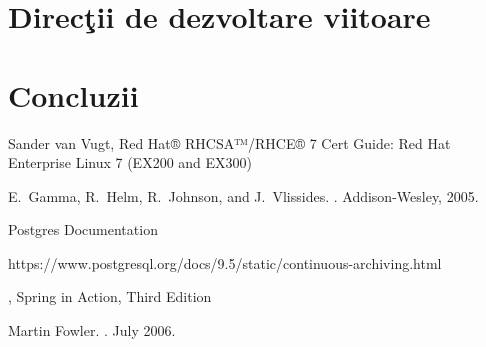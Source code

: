 \documentclass[12, twoside]{report}
\begin{document}
\chapter{Direcţii de dezvoltare viitoare}


\chapter*{Concluzii}


%

\begin{thebibliography}{10}

\newblock Sander van Vugt,
\newblock Red Hat® RHCSA™/RHCE® 7 Cert Guide: Red Hat Enterprise Linux 7 (EX200 and EX300)

E.~Gamma, R.~Helm, R.~Johnson, and J.~Vlissides.
.
\newblock Addison-Wesley, 2005.

Postgres Documentation
\par
\newblock https://www.postgresql.org/docs/9.5/static/continuous-archiving.html

,
\newblock Spring in Action, Third Edition

Martin Fowler.
.
 July 2006.

\end{thebibliography}

\end{document}

